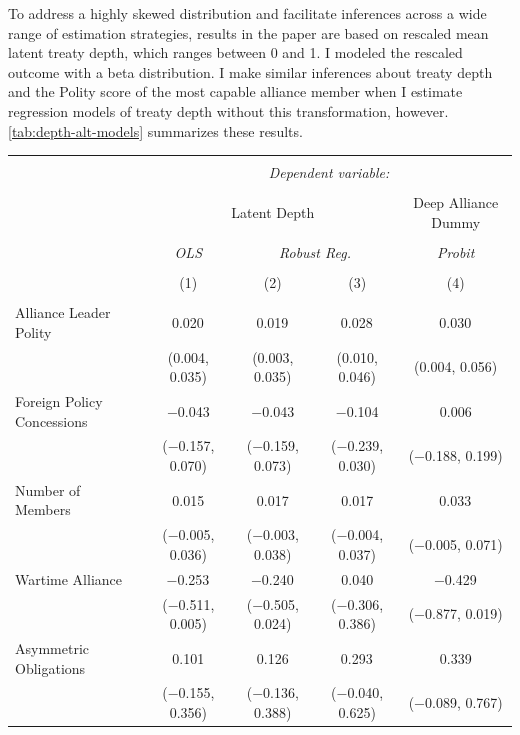 \documentclass[12pt]{article}
\begin{document}
To address a highly skewed distribution and facilitate inferences across a wide range of estimation strategies, results in the paper are based on rescaled mean latent treaty depth, which ranges between 0 and 1. 
I modeled the rescaled outcome with a beta distribution. 
I make similar inferences about treaty depth and the Polity score of the most capable alliance member when I estimate regression models of treaty depth without this transformation, however. 
\autoref{tab:depth-alt-models} summarizes these results. 

\begin{table}[!htbp] 
\centering 
\begin{adjustbox}{width= .95\textwidth, center}
\begin{tabular}{@{\extracolsep{5pt}}lcccc} 
\\[-1.8ex]\hline 
\hline \\[-1.8ex] 
 & \multicolumn{4}{c}{\textit{Dependent variable:}} \\ 
\cline{2-5} 
\\[-1.8ex] & \multicolumn{3}{c}{Latent Depth} & Deep Alliance Dummy \\ 
\\[-1.8ex] & \textit{OLS} & \multicolumn{2}{c}{\textit{Robust Reg.}} & \textit{Probit} \\ 
\\[-1.8ex] & (1) & (2) & (3) & (4)\\ 
\hline \\[-1.8ex] 
 Alliance Leader Polity & 0.020$^{}$ & 0.019$^{}$ & 0.028$^{}$ & 0.030$^{}$ \\ 
  & (0.004, 0.035) & (0.003, 0.035) & (0.010, 0.046) & (0.004, 0.056) \\ 
  Foreign Policy Concessions & $-$0.043 & $-$0.043 & $-$0.104 & 0.006 \\ 
  & ($-$0.157, 0.070) & ($-$0.159, 0.073) & ($-$0.239, 0.030) & ($-$0.188, 0.199) \\ 
  Number of Members & 0.015 & 0.017 & 0.017 & 0.033$^{}$ \\ 
  & ($-$0.005, 0.036) & ($-$0.003, 0.038) & ($-$0.004, 0.037) & ($-$0.005, 0.071) \\ 
  Wartime Alliance & $-$0.253$^{}$ & $-$0.240$^{}$ & 0.040 & $-$0.429$^{}$ \\ 
  & ($-$0.511, 0.005) & ($-$0.505, 0.024) & ($-$0.306, 0.386) & ($-$0.877, 0.019) \\ 
  Asymmetric Obligations & 0.101 & 0.126 & 0.293$^{}$ & 0.339 \\ 
  & ($-$0.155, 0.356) & ($-$0.136, 0.388) & ($-$0.040, 0.625) & ($-$0.089, 0.767) \\ 

\end{tabular}
\end{adjustbox}
\end{table}
\end{document}
